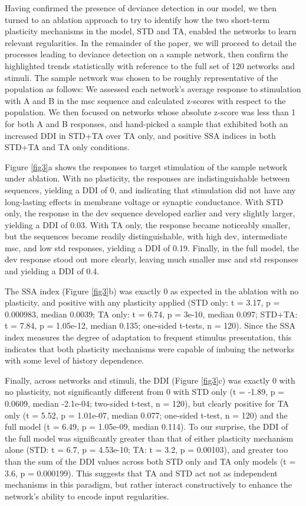 \documentclass[pdflatex,referee,iicol,sn-basic]{sn-jnl}
\theoremstyle{thmstyleone}%
\theoremstyle{thmstyletwo}%
\theoremstyle{thmstylethree}%
\begin{document}
Having confirmed the presence of deviance detection in our model, we then turned to an ablation approach to try to identify how the two short-term plasticity mechanisms in the model, STD and TA, enabled the networks to learn relevant regularities. In the remainder of the paper, we will proceed to detail the processes leading to deviance detection on a sample network, then confirm the highlighted trends statistically with reference to the full set of 120 networks and stimuli. The sample network was chosen to be roughly representative of the population as follows: We assessed each network's average response to stimulation with A and B in the msc sequence and calculated z-scores with respect to the population. We then focused on networks whose absolute z-score was less than 1 for both A and B responses, and hand-picked a sample that exhibited both an increased DDI in STD+TA over TA only, and positive SSA indices in both STD+TA and TA only conditions.

Figure \ref{fig3}a shows the responses to target stimulation of the sample network under ablation. With no plasticity, the responses are indistinguishable between sequences, yielding a DDI of 0, and indicating that stimulation did not have any long-lasting effects in membrane voltage or synaptic conductance. With STD only, the response in the dev sequence developed earlier and very slightly larger, yielding a DDI of 0.03. With TA only, the response became noticeably smaller, but the sequences became readily distinguishable, with high dev, intermediate msc, and low std responses, yielding a DDI of 0.19. Finally, in the full model, the dev response stood out more clearly, leaving much smaller msc and std responses and yielding a DDI of 0.4.

The SSA index (Figure \ref{fig3}b) was exactly 0 as expected in the ablation with no plasticity, and positive with any plasticity applied (STD only: t = 3.17, p = 0.000983, median 0.0039; TA only: t = 6.74, p = 3e-10, median 0.097; STD+TA: t = 7.84, p = 1.05e-12, median 0.135; one-sided t-tests, n = 120). Since the SSA index measures the degree of adaptation to frequent stimulus presentation, this indicates that both plasticity mechanisms were capable of imbuing the networks with some level of history dependence.

Finally, across networks and stimuli, the DDI (Figure \ref{fig3}c) was exactly 0 with no plasticity, not significantly different from 0 with STD only (t = -1.89, p = 0.0609, median -2.1e-04; two-sided t-test, n = 120), but clearly positive for TA only (t = 5.52, p = 1.01e-07, median 0.077; one-sided t-test, n = 120) and the full model (t = 6.49, p = 1.05e-09, median 0.114). To our surprise, the DDI of the full model was significantly greater than that of either plasticity mechanism alone (STD: t = 6.7, p = 4.53e-10; TA: t = 3.2, p = 0.00103), and greater too than the sum of the DDI values across both STD only and TA only models (t = 3.6, p = 0.000199). This suggests that TA and STD act not as independent mechanisms in this paradigm, but rather interact constructively to enhance the network's ability to encode input regularities.
\end{document}
